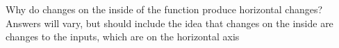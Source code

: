 {Why do changes on the inside of the function produce horizontal changes?}
{Answers will vary, but should include the idea that changes on the inside are changes to the inputs, which are on the horizontal axis}
